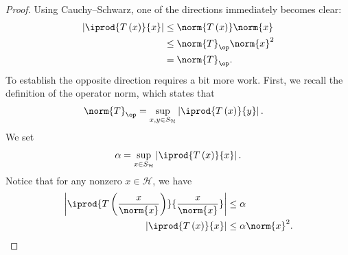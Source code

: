 \begin{proof}
  Using Cauchy--Schwarz, one of the directions immediately becomes clear:
  \begin{align*}
    \left\vert \iprod{T\left( x \right)}{x} \right\vert &\leq \norm{T\left( x \right)}\norm{x}\\
                                                        &\leq \norm{T}_{\op}\norm{x}^2\\
                                                        &= \norm{T}_{\op}.
  \end{align*}
  To establish the opposite direction requires a bit more work. First, we recall the definition of the operator norm, which states that
  \begin{align*}
    \norm{T}_{\op} &= \sup_{x,y\in S_{\mathcal{H}}}\left\vert \iprod{T\left( x \right)}{y} \right\vert.
  \end{align*}
  We set 
  \begin{align*}
    \alpha = \sup_{x\in S_{\mathcal{H}}} \left\vert \iprod{T\left( x \right)}{x} \right\vert.
  \end{align*}
  Notice that for any nonzero $x\in \mathcal{H}$, we have
  \begin{align*}
    \left\vert \iprod{T\left( \frac{x}{\norm{x}} \right)}{\frac{x}{\norm{x}}} \right\vert &\leq \alpha\\
    \left\vert \iprod{T\left( x \right)}{x} \right\vert &\leq \alpha \norm{x}^2.
  \end{align*}
  

\end{proof}
